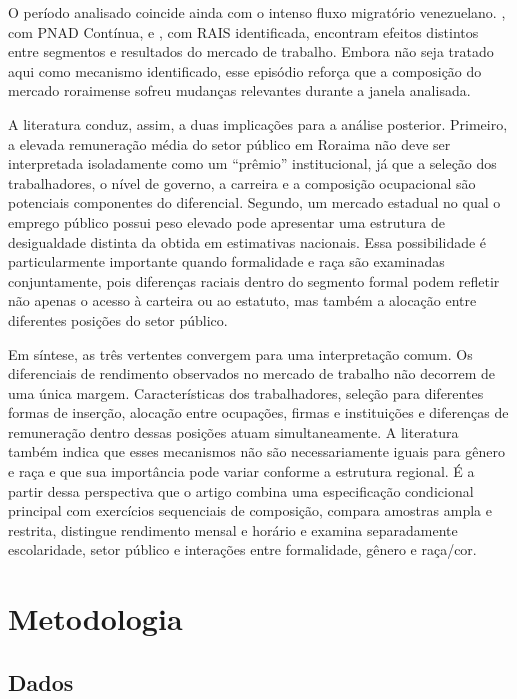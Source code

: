 \documentclass[12pt]{article}
\begin{document}
O período analisado coincide ainda com o intenso fluxo migratório venezuelano. 
\citet{ryu2022}, com PNAD Contínua, e \citet{santanna2024}, com RAIS
identificada, encontram efeitos distintos entre segmentos e resultados do mercado de 
trabalho. Embora não seja tratado aqui como mecanismo identificado, esse episódio 
reforça que a composição do mercado roraimense sofreu mudanças relevantes durante 
a janela analisada.

A literatura conduz, assim, a duas implicações para a análise posterior. Primeiro, a 
elevada remuneração média do setor público em Roraima não deve ser interpretada isoladamente 
como um “prêmio” institucional, já que a seleção dos trabalhadores, o nível de governo, a carreira e 
a composição ocupacional são potenciais componentes do diferencial. Segundo, um mercado estadual 
no qual o emprego público possui peso elevado pode apresentar uma estrutura de desigualdade 
distinta da obtida em estimativas nacionais. Essa possibilidade é particularmente importante 
quando formalidade e raça são examinadas conjuntamente, pois diferenças raciais dentro do 
segmento formal podem refletir não apenas o acesso à carteira ou ao estatuto, mas também a 
alocação entre diferentes posições do setor público.

Em síntese, as três vertentes convergem para uma interpretação comum. Os diferenciais de 
rendimento observados no mercado de trabalho não decorrem de uma única margem. Características 
dos trabalhadores, seleção para diferentes formas de inserção, alocação entre ocupações, 
firmas e instituições e diferenças de remuneração dentro dessas posições atuam simultaneamente. 
A literatura também indica que esses mecanismos não são necessariamente iguais para gênero 
e raça e que sua importância pode variar conforme a estrutura regional. É a partir dessa 
perspectiva que o artigo combina uma especificação condicional principal com exercícios 
sequenciais de composição, compara amostras ampla e restrita, distingue rendimento mensal 
e horário e examina separadamente escolaridade, setor público e interações entre 
formalidade, gênero e raça/cor.

\section{Metodologia}
\label{sec:metodologia}

\subsection{Dados}
\label{subsec:dados}
\end{document}
